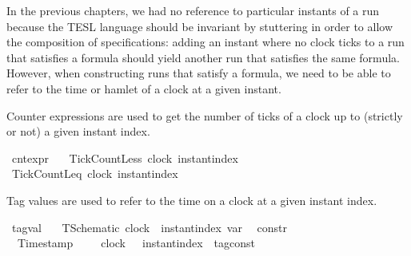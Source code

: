 \begin{isabellebody}
\begin{isamarkuptext}
  In the previous chapters, we had no reference to particular instants of a run 
  because the TESL language should be invariant by stuttering in order to allow 
  the composition of specifications: adding an instant where no clock ticks to 
  a run that satisfies a formula should yield another run that satisfies the 
  same formula. However, when constructing runs that satisfy a formula, we
  need to be able to refer to the time or hamlet of a clock at a given instant.%
\end{isamarkuptext}\isamarkuptrue%
%
\begin{isamarkuptext}%
Counter expressions are used to get the number of ticks of a clock up to 
  (strictly or not) a given instant index.%
\end{isamarkuptext}\isamarkuptrue%
\isamarkupfalse%
\ cnt{\isacharunderscore}expr\ {\isacharequal}\isanewline
\ \ TickCountLess\ {\isacartoucheopen}clock{\isacartoucheclose}\ {\isacartoucheopen}instant{\isacharunderscore}index{\isacartoucheclose}\ {\isacharparenleft}{\isacartoucheopen}{\isacharhash}\isactrlsup {\isacharless}{\isacartoucheclose}{\isacharparenright}\isanewline
{\isacharbar}\ TickCountLeq\ {\isacartoucheopen}clock{\isacartoucheclose}\ {\isacartoucheopen}instant{\isacharunderscore}index{\isacartoucheclose}\ \ {\isacharparenleft}{\isacartoucheopen}{\isacharhash}\isactrlsup {\isasymle}{\isacartoucheclose}{\isacharparenright}%
\isadelimdocument
%
\endisadelimdocument
%
\isatagdocument
%
\isamarkuptrue%
%
\endisatagdocument
{\isafolddocument}%
%
\isadelimdocument
%
\endisadelimdocument
%
\begin{isamarkuptext}%
Tag values are used to refer to the time on a clock at a given instant index.%
\end{isamarkuptext}\isamarkuptrue%
\isamarkupfalse%
\ tag{\isacharunderscore}val\ {\isacharequal}\isanewline
\ \ TSchematic\ {\isacartoucheopen}clock\ {\isacharasterisk}\ instant{\isacharunderscore}index{\isacartoucheclose}\ {\isacharparenleft}{\isacartoucheopen}{\isasymtau}\isactrlsub v\isactrlsub a\isactrlsub r{\isacartoucheclose}{\isacharparenright}\isanewline
\isanewline
{}\isamarkupfalse%
\ {\isacharprime}{\isasymtau}\ constr\ {\isacharequal}\isanewline
%
\isanewline
\ \ Timestamp\ \ \ \ \ {\isacartoucheopen}clock{\isacartoucheclose}\ \ \ {\isacartoucheopen}instant{\isacharunderscore}index{\isacartoucheclose}\ {\isacartoucheopen}{\isacharprime}{\isasymtau}\ tag{\isacharunderscore}const{\isacartoucheclose}\ \ \ \ \ \ \ \ \ {\isacharparenleft}{\isacartoucheopen}{\isacharunderscore}\ {\isasymDown}\ {\isacharunderscore}\ {\isacharat}\ {\isacharunderscore}{\isacartoucheclose}{\isacharparenright}\isanewline

\end{isabellebody}
